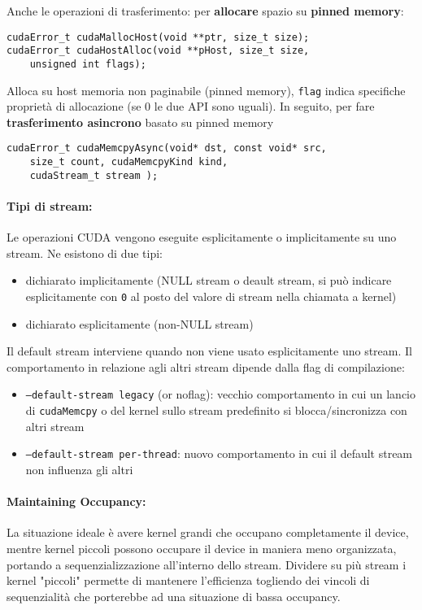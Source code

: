 Anche le operazioni di trasferimento: per \textbf{allocare} spazio su \textbf{pinned memory}:
\begin{verbatim}
cudaError_t cudaMallocHost(void **ptr, size_t size);
cudaError_t cudaHostAlloc(void **pHost, size_t size, 
	unsigned int flags);
\end{verbatim}
Alloca su host memoria non paginabile (pinned memory), \texttt{flag} indica specifiche proprietà di allocazione (se 0 le due API sono uguali). In seguito, per fare \textbf{trasferimento asincrono} basato su pinned memory
\begin{verbatim}
cudaError_t cudaMemcpyAsync(void* dst, const void* src, 
	size_t count, cudaMemcpyKind kind, 
	cudaStream_t stream );
\end{verbatim}

\paragraph{Tipi di stream:} Le operazioni CUDA vengono eseguite esplicitamente o implicitamente su uno stream. Ne esistono di due tipi: 
\begin{itemize}
	\item dichiarato implicitamente (NULL stream o deault stream, si può indicare esplicitamente con \texttt{0} al posto del valore di stream nella chiamata a kernel)
	\item dichiarato esplicitamente (non-NULL stream)
\end{itemize}

Il default stream interviene quando non viene usato esplicitamente uno stream. Il comportamento in relazione agli altri stream dipende dalla flag di compilazione:
\begin{itemize}
	\item \texttt{--default-stream legacy} (or noflag): vecchio comportamento in cui un lancio di \texttt{cudaMemcpy} o del kernel sullo stream predefinito si blocca/sincronizza con altri stream
	\item \texttt{--default-stream per-thread}: nuovo comportamento in cui il default stream non influenza gli altri
\end{itemize}


\paragraph{Maintaining Occupancy:} La situazione ideale è avere kernel grandi che occupano completamente il device, mentre kernel piccoli possono occupare il device in maniera meno organizzata, portando a sequenzializzazione all'interno dello stream. Dividere su più stream i kernel "piccoli" permette di mantenere l'efficienza togliendo dei vincoli di sequenzialità che porterebbe ad una situazione di bassa occupancy.\\

